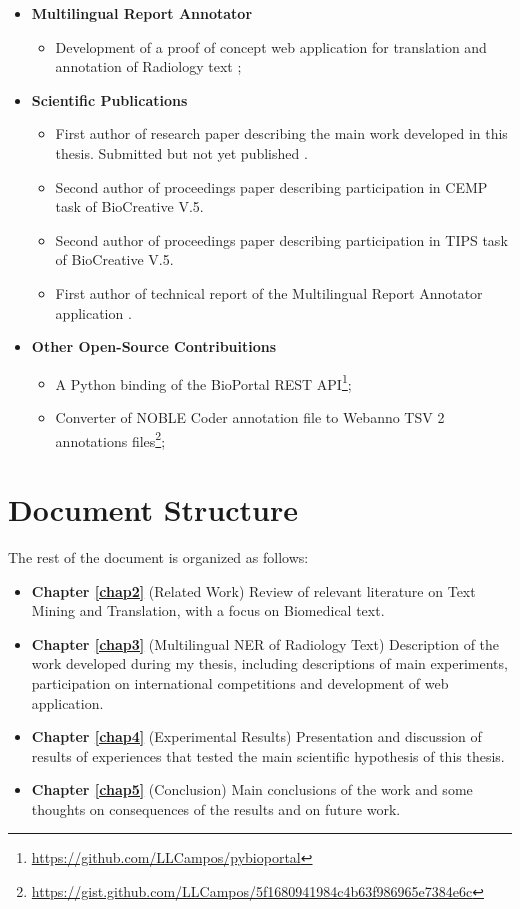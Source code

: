 \begin{itemize}
\item \textbf{Multilingual Report Annotator}
\begin{itemize}
	\item Development of a proof of concept web application for translation and annotation of Radiology text \citep{Campos2017};
\end{itemize}
	
\item \textbf{Scientific Publications}
	\begin{itemize}
		\item First author of research paper describing the main work developed in this thesis. Submitted but not yet published \citep{Campos}.
		\item Second author of proceedings paper describing participation in CEMP task of BioCreative V.5.
		\item Second author of proceedings paper describing participation in TIPS task of BioCreative V.5.	
		\item First author of technical report of the Multilingual Report Annotator application \citep{Campos2017}.
	\end{itemize}
	
\item \textbf{Other Open-Source Contribuitions}
	\begin{itemize}
		\item A Python binding of the BioPortal REST API\footnote{\url{https://github.com/LLCampos/pybioportal}};
		\item Converter of NOBLE Coder annotation file to Webanno TSV 2 annotations files\footnote{\url{https://gist.github.com/LLCampos/5f1680941984c4b63f986965e7384e6c}};
	\end{itemize}

	 
\end{itemize}

\section{Document Structure}
The rest of the document is organized as follows:
\begin{itemize}
	\item \textbf{Chapter \ref{chap2}} (Related Work) Review of relevant literature on Text Mining and Translation, with a focus on Biomedical text.
	\item \textbf{Chapter \ref{chap3}} (Multilingual NER of Radiology Text) Description of the work developed during my thesis, including descriptions of main experiments, participation on international competitions and development of web application.
	\item \textbf{Chapter \ref{chap4}} (Experimental Results) Presentation and discussion of results of experiences that tested the main scientific hypothesis of this thesis.
	\item \textbf{Chapter \ref{chap5}} (Conclusion) Main conclusions of the work and some thoughts on consequences of the results and on future work.
\end{itemize}



